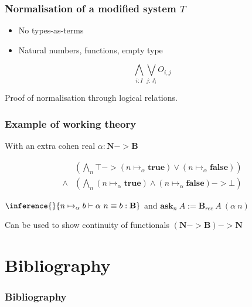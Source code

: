 \documentclass{beamer}
\newcommand{\0}{\boldsymbol{0}}
\newcommand{\1}{\boldsymbol{1}}
\begin{document}
\begin{frame}
    \frametitle{Normalisation of a modified system $T$}
    \begin{itemize}
        \item No types-as-terms
        \item Natural numbers, functions, empty type
    \end{itemize}
    $$\bigwedge_{i : I}\bigvee_{j : J_i} O_{i,j}$$

    Proof of normalisation through logical relations.
\end{frame}

\begin{frame}
    \frametitle{Example of working theory}
    With an extra cohen real $\alpha : \mathbf{N} -> \mathbf{B}$

    $$ \begin{array}{rl}
        &\left(\bigwedge_{n} \top -> (n \mapsto_\alpha \mathbf{true}) \vee (n \mapsto_\alpha \mathbf{false})\right)\\
        \land &\left(\bigwedge_{n } (n\mapsto_\alpha \mathbf{true}) \wedge (n \mapsto_\alpha \mathbf{false}) -> \bot \right)
    \end{array} $$
    \vspace{0cm} 

\centering $\inference{}{n\mapsto_\alpha b\vdash\alpha\ n \equiv b : \mathbf{B}}$ and $\mathbf{ask}_n\ A:= \mathbf{B}_{rec}\ A\ (\alpha\ n)$
\vspace{0.5cm}

Can be used to show continuity of functionals $(\mathbf{N} -> \mathbf{B}) -> \mathbf{N}$

\end{frame}

\section{Bibliography}

\begin{frame}[allowframebreaks]
    \frametitle{Bibliography}

    \printbibliography

\end{frame}
\end{document}
